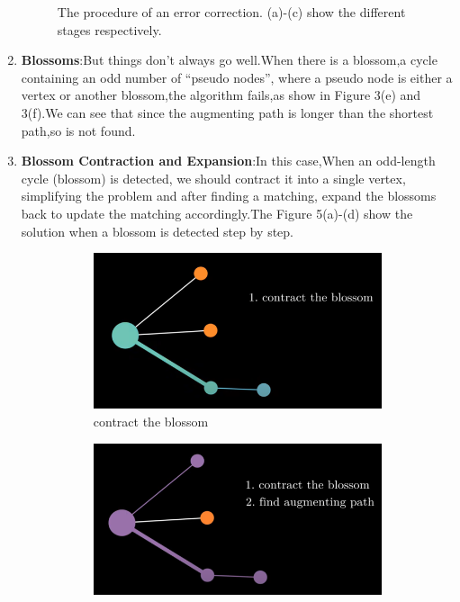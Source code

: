 \documentclass[
	a4paper, %
	10pt, %
	unnumberedsections, %
	twoside, %
]{LTJournalArticle}
\begin{document}
\begin{enumerate}
\begin{figure}[htbp]
\begin{subfigure}[b]{0.9\linewidth}
        \caption{}
        \label{fig:subfig3}
    \end{subfigure}
    \caption{The procedure of an error correction. (a)-(c) show the different stages respectively.}
    \label{fig:threefigs}
\end{figure}
	\item \textbf{Blossoms}:But things don't always go well.When there is a blossom,a cycle containing an odd number of “pseudo nodes”, where a pseudo node is either a vertex or another blossom,the algorithm fails,as show in Figure 3(e) and 3(f).We can see that since the augmenting path is longer than the shortest path,so is not found.
	\item \textbf{Blossom Contraction and Expansion}:In this case,When an odd-length cycle (blossom) is detected, we should contract it into a single vertex, simplifying the problem and after finding a matching, expand the blossoms back to update the matching accordingly.The Figure 5(a)-(d) show the solution when a blossom is detected step by step.
	\begin{figure}[htbp] %
	\centering	%
	\vspace{-0.8cm}   %
	\setlength{\abovecaptionskip}{0.cm} %
	\setlength{\abovecaptionskip}{0.cm} %
	\setlength{\belowdisplayskip}{3pt} 	
    \begin{subfigure}[b]{0.45\linewidth}
        \includegraphics[width=\linewidth]{img/blossom algorithm 8.1.png}
        \caption{contract the blossom}
        \label{fig:subfig1}
    \end{subfigure}
    \hfill
    \begin{subfigure}[b]{0.45\linewidth}
        \includegraphics[width=\linewidth]{img/blossom algorithm 8,2.png}

\end{subfigure}
\end{figure}
\end{enumerate}
\end{document}
